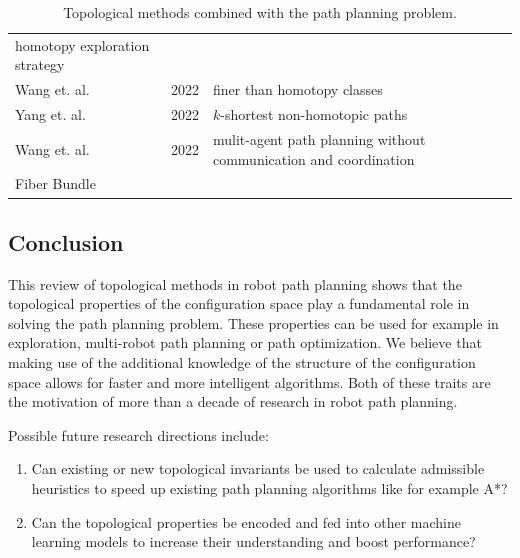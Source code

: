 \documentclass[11pt,twocolumn]{article}
\begin{document}
\begin{table}
\begin{tabular}{l c p{8cm}}
                                                                              homotopy
                                                                              exploration
                                                                              strategy
    \\
    Wang et. al. \cite{wangConstructingFinerThen2022} & 2022 &
                                                               finer than
                                                               homotopy
                                                               classes \\
    Yang et. al. \cite{yangEfficientSearchShortest2022} & 2022 &
                                                                 \(k\)-shortest
                                                                 non-homotopic
                                                                 paths \\
    Wang et. al. \cite{wangCoordinationfreeMultirobotPath2022} & 2022
               & mulit-agent path planning
                 without communication and
                 coordination \\
    \hline
    Fiber Bundle & & \\
    \hline
  \end{tabular}
  \caption{Topological methods combined with the path planning
    problem.}
  \label{tab:topological-methods}
\end{table}

\subsection*{Conclusion}
This review of topological methods in robot path planning shows that
the topological properties of the configuration space play a
fundamental role in solving the path planning problem. These
properties can be used for example in exploration, multi-robot path
planning or path optimization. We believe that making use of the
additional knowledge of the structure of the configuration space
allows for faster and more intelligent algorithms. Both of these
traits are the motivation of more than a decade of research in robot
path planning.

Possible future research directions include:
\begin{enumerate}
\item Can existing or new topological invariants be used to calculate
  admissible heuristics to speed up existing path planning algorithms
  like for example A*?
\item Can the topological properties be encoded
  \cite{chazalIntroductionTopologicalData2021} and fed into other
  machine learning models to increase their understanding and boost
  performance?
\end{enumerate}

 
\end{document}
